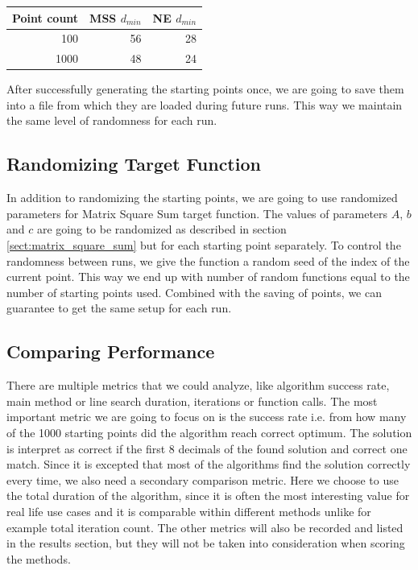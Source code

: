 \documentclass[a4paper,english,titlepage,12pt]{article}
\begin{document}
\begin{table}[H]
\centering
{}
\label{tab:dmin_values}
\begin{tabular}{|r|r|r|}
\hline
\rowcolor[HTML]{C0C0C0} 
Point count                       & MSS $d_{min}$ & NE $d_{min}$ \\ \hline
\cellcolor[HTML]{EFEFEF}100  & 56           & 28          \\ \hline
\cellcolor[HTML]{EFEFEF}1000 & 48           & 24          \\ \hline
\end{tabular}
\end{table}

After successfully generating the starting points once, we are going to save them into a file from which they are loaded during future runs. This way we maintain the same level of randomness for each run.

\subsection{Randomizing Target Function}

In addition to randomizing the starting points, we are going to use randomized parameters for Matrix Square Sum target function. The values of parameters $A$, $b$ and $c$ are going to be randomized as described in section \ref{sect:matrix_square_sum} but for each starting point separately. To control the randomness between runs, we give the function a random seed of the index of the current point. This way we end up with number of random functions equal to the number of starting points used. Combined with the saving of points, we can guarantee to get the same setup for each run.

\subsection{Comparing Performance}


There are multiple metrics that we could analyze, like algorithm success rate, main method or line search duration, iterations or function calls. The most important metric we are going to focus on is the success rate i.e. from how many of the 1000 starting points did the algorithm reach correct optimum. The solution is interpret as correct if the first 8 decimals of the found solution and correct one match.
Since it is excepted that most of the algorithms find the solution correctly every time, we also need a secondary comparison metric. Here we choose to use the total duration of the algorithm, since it is often the most interesting value for real life use cases and it is comparable within different methods unlike for example total iteration count. The other metrics will also be recorded and listed in the results section, but they will not be taken into consideration when scoring the methods.
\end{document}

